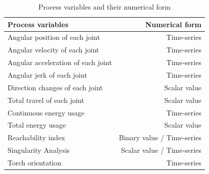 \begin{table}[H]
	\centering
	\begin{tabular}{||l|r||}
		\hline
		Process variables & Numerical form\\
		\hline
		\hline
		\hline
		Angular position of each joint & Time-series\\
		Angular velocity of each joint & Time-series\\
		Angular acceleration of each joint& Time-series\\
		Angular jerk of each joint& Time-series\\
		\hline
		\hline
		Direction changes of each joint& Scalar value\\
		Total travel of each joint& Scalar value\\
		\hline
		\hline	
		
		
		
		Continuous energy usage & Time-series\\
		Total energy usage & Scalar value\\
		\hline
		\hline
		Reachability index & Binary value / Time-series\\
		Singularity Analysis & Scalar value / Time-series\\
		Torch orientation & Time-series\\
		
		
		\hline
		\hline
		
	\end{tabular}
	
	
	\caption{Process variables and their numerical form}
	\label{procesparameters}
\end{table}

